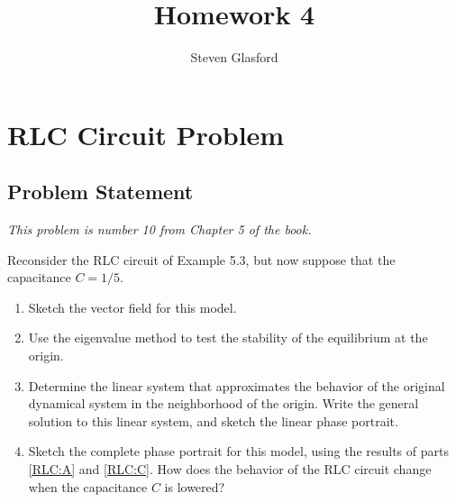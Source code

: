 \documentclass[12pt]{report}
\title{Homework 4}
\author{Steven Glasford}
\date{\parbox{\linewidth}{\centering%
    \today\endgraf\medskip
    Math-451-M001}}
\begin{document}
\maketitle
\tableofcontents



\chapter{RLC Circuit Problem}

\section{Problem Statement}



\emph{This problem is number 10 from Chapter 5 of the book.} 

Reconsider the RLC circuit of Example 5.3, but now suppose that the capacitance $C=1/5$.
\begin{enumerate}[label=(\alph*),ref=(\alph*)]
    \item\label{RLC:A} Sketch the vector field for this model.
    \item\label{RLC:B} Use the eigenvalue method to test the stability of the equilibrium at the origin.
    \item\label{RLC:C} Determine the linear system that approximates the behavior of the original dynamical system in the neighborhood of the origin. Write the general solution to this linear system, and sketch the linear phase portrait.
    \item\label{RLC:D} Sketch the complete phase portrait for this model, using the results of parts \ref{RLC:A} and \ref{RLC:C}. How does the behavior of the RLC circuit change when the capacitance $C$ is lowered? 
\end{enumerate}
\end{document}
